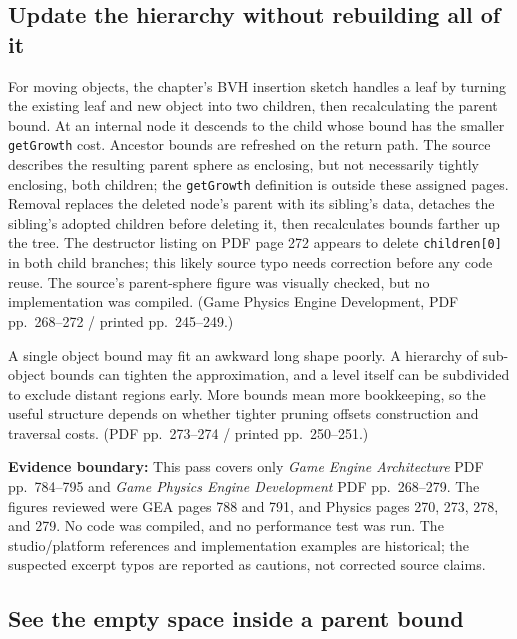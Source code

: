 \subsection{Update the hierarchy without rebuilding all of it}\label{06-engine-ii-ch033-update-the-hierarchy-without-rebuilding-all-of-it}

For moving objects, the chapter's BVH insertion sketch handles a leaf by turning the existing leaf and new object into two children, then recalculating the parent bound. At an internal node it descends to the child whose bound has the smaller \texttt{getGrowth} cost. Ancestor bounds are refreshed on the return path. The source describes the resulting parent sphere as enclosing, but not necessarily tightly enclosing, both children; the \texttt{getGrowth} definition is outside these assigned pages. Removal replaces the deleted node's parent with its sibling's data, detaches the sibling's adopted children before deleting it, then recalculates bounds farther up the tree. The destructor listing on PDF page 272 appears to delete \texttt{children{[}0{]}} in both child branches; this likely source typo needs correction before any code reuse. The source's parent-sphere figure was visually checked, but no implementation was compiled. (Game Physics Engine Development, PDF pp.~268--272 / printed pp.~245--249.)

A single object bound may fit an awkward long shape poorly. A hierarchy of sub-object bounds can tighten the approximation, and a level itself can be subdivided to exclude distant regions early. More bounds mean more bookkeeping, so the useful structure depends on whether tighter pruning offsets construction and traversal costs. (PDF pp.~273--274 / printed pp.~250--251.)

\textbf{Evidence boundary:} This pass covers only \emph{Game Engine Architecture} PDF pp.~784--795 and \emph{Game Physics Engine Development} PDF pp.~268--279. The figures reviewed were GEA pages 788 and 791, and Physics pages 270, 273, 278, and 279. No code was compiled, and no performance test was run. The studio/platform references and implementation examples are historical; the suspected excerpt typos are reported as cautions, not corrected source claims.

\subsection{See the empty space inside a parent bound}\label{06-engine-ii-ch033-see-the-empty-space-inside-a-parent-bound}


